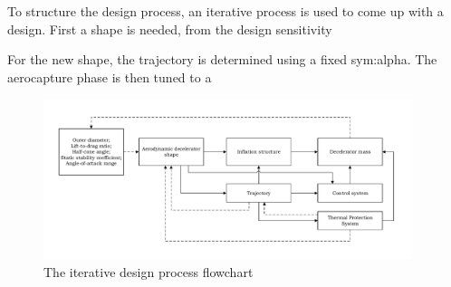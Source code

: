 To structure the design process, an iterative process is used to come up with a design. First a shape is needed, from the design sensitivity 



For the new shape, the trajectory is determined using a fixed \gls{sym:alpha}. The aerocapture phase is then tuned to a 


\begin{figure}[h!]
		\vspace{-1cm}
		\includegraphics[width=0.96\textwidth]{./Figure/DesignIterationPhilosophy.pdf}
		\vspace{-2.3cm}
		\caption{The iterative design process flowchart}
		\label{fig:rot}
\end{figure}